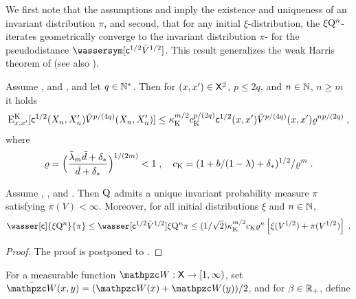 \documentclass[sn-mathphys,Numbered]{sn-jnl}%
\begin{document}
We first note that the assumptions  and  imply the existence and uniqueness of an invariant distribution $\pi$, and second, that for any initial $\xi$-distribution, the $\xi {\rm Q} ^n$-iterates geometrically converge  to the invariant distribution $\pi$- for the pseudodistance $\wassersym[\metricc^{1/2} \bar{V}^{1/2}]$. This result generalizes the weak Harris theorem of \cite{hairer2011asymptotic} (see also \cite[Theorem~20.4.5]{douc:moulines:priouret:soulier:2018}).
\begin{proposition}
\label{prop:wasser:geo}
Assume ,  and , and let $q \in \mathbb{N}^*$. Then for $(x,x')\in \mathsf{X}^2$, $p \le 2q$, and $n\in \mathbb{N}$, $n \geq m$ it holds
\begin{equation}
\label{eq: constraction}
\mathrm{E}_{x,x'}^{{\rm K}}[\mathsf{c}^{1/2}(X_n, X_n') \bar V^{p/(4q)}(X_n, X'_n)] \leq  \kappa_{{\rm K}}^{m/2} c_{{\rm K}}^{p/(2q)}  \mathsf{c}^{1/2}(x,x') \bar{V}^{p/(4q)}(x,x') \varrho^{np/(2q)}  \;,
\end{equation}
where
\begin{equation}
\label{eq:def:rho}
\varrho  = \Bigl(\frac{\bar \lambda_m \bar{d}+\delta_*}{\bar{d}+\delta_*} \Bigr)^{1/(2m)} < 1 \;,  \quad c_{{\rm K}} = (1 + b/(1-\lambda) + \delta_*)^{1/2} / \varrho^m \;.
\end{equation}
\end{proposition}
\begin{corollary}
\label{cor:wasserstein-convergence}
Assume , , and . Then ${\rm Q}$ admits a unique invariant probability measure $\pi$ satisfying $\pi(V) < \infty$. Moreover, for all
  initial distributions $\xi$ and $n\in \mathbb{N}$,
  \begin{equation}
    \label{eq:wasser:geo:bound:pi}
    \wasser[\cost]{\xi \MK^n}{\pi} \leq \wasser[\cost^{1/2} \bar V^{1/2}]{\xi \MK^n}{\pi}
    \leq  (1/\sqrt{2}) \boundmetric^{m/2} \vartconstwas  \ratewas^{n}    \lrb{\xi(V^{1/2})+\pi(V^{1/2})} \eqsp.
  \end{equation}
\end{corollary}
\begin{proof}
The proof is postponed to .
\end{proof}
For a measurable function  $\lyapW: \Xset \to \coint{1,\infty}$, set $\bar \lyapW(x,y) = (\lyapW(x) + \lyapW(y))/2$, and for  $\beta \in \mathbb{R}_+$, define
\end{document}
